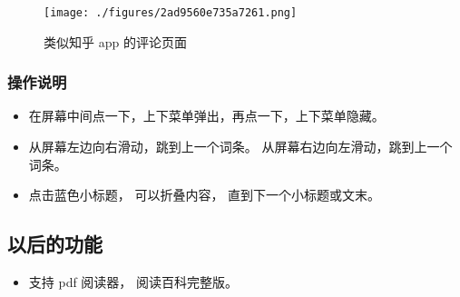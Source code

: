 \begin{figure}[ht]
\centering
\texttt{[image: ./figures/2ad9560e735a7261.png]}
\caption{类似知乎 app 的评论页面} \label{fig_app_2}
\end{figure}

\subsubsection{操作说明}
\begin{itemize}
\item 在屏幕中间点一下，上下菜单弹出，再点一下，上下菜单隐藏。
\item 从屏幕左边向右滑动，跳到上一个词条。 从屏幕右边向左滑动，跳到上一个词条。
\item 点击蓝色小标题， 可以折叠内容， 直到下一个小标题或文末。
\end{itemize}

\subsection{以后的功能}
\begin{itemize}
\item 支持 pdf 阅读器， 阅读百科完整版。
\end{itemize}

